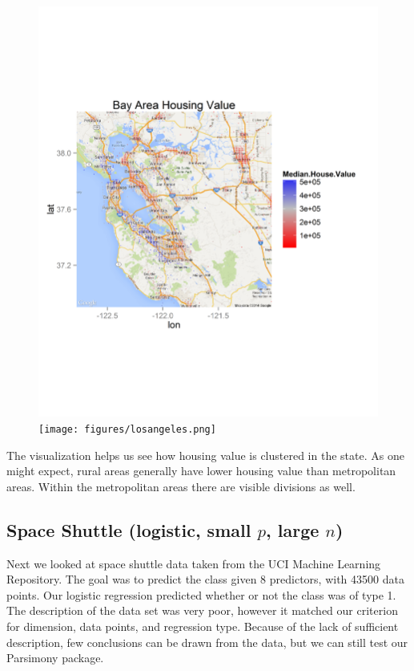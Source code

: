 \documentclass[letter]{article}
\begin{document}
\begin{figure}[H]
\includegraphics[scale=.54]{figures/bayarea.png}
\texttt{[image: figures/losangeles.png]}
\end{figure}

The visualization helps us see how housing value is clustered in the state. As one might expect, rural areas generally have lower housing value than metropolitan areas. Within the metropolitan areas there are visible divisions as well. 




\subsection*{Space Shuttle \cite{shuttle} (logistic, small $p$, large $n$)}
Next we looked at space shuttle data taken from the UCI Machine Learning Repository. The goal was to predict the class given 8 predictors, with 43500 data points. Our logistic regression predicted whether or not the class was of type 1.  The description of the data set was very poor, however it matched our criterion for dimension, data points, and regression type. Because of the lack of sufficient description, few conclusions can be drawn from the data, but we can still test our Parsimony package.
\end{document}
